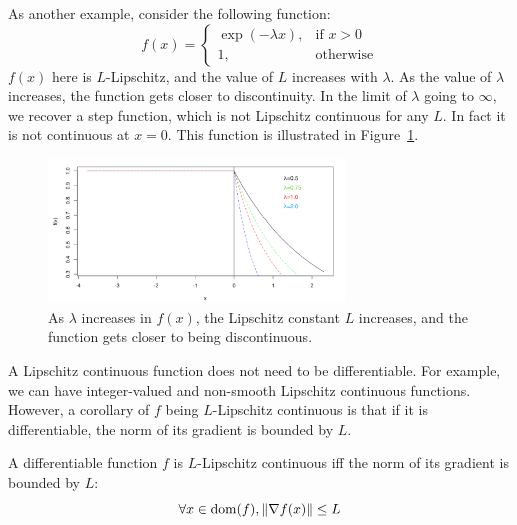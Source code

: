 \documentclass{article}
\DeclareMathOperator*{\dom}{dom}
\DeclarePairedDelimiter{\norm}{\lVert}{\rVert}
\begin{document}

As another example, consider the following function:
\[
    f(x)= 
\begin{cases}
    \exp(-\lambda x),& \text{if } x > 0\\
    1,              & \text{otherwise}
\end{cases}
\]
$f(x)$ here is $L$-Lipschitz, and the value of $L$ increases with $\lambda$.
As the value of $\lambda$ increases, the function gets closer to discontinuity.
In the limit of $\lambda$ going to $\infty$, we recover a step function, which is not Lipschitz continuous for any $L$.
In fact it is not continuous at $x=0$.
This function is illustrated in Figure~\ref{fig:lambda}.

\begin{figure}[ht]
\centering
    \includegraphics[width=0.7\textwidth]{lambda.png}
    \vspace{-10px}
    \caption{As $\lambda$ increases in $f(x)$, the Lipschitz constant $L$ increases, and the function gets closer to being discontinuous.}
    \label{fig:lambda}
\end{figure}

A Lipschitz continuous function does not need to be differentiable. For example, we can have integer-valued and non-smooth Lipschitz continuous functions. However, a corollary of $f$ being $L$-Lipschitz continuous is that if it is differentiable, the norm of its gradient is bounded by $L$.

\begin{lemma}\label{lemma:lip}
    A differentiable function $f$ is $L$-Lipschitz continuous iff the norm of its gradient is bounded by $L$:
    \[
    \forall x \in \dom(f), \norm{\nabla f(x)} \leq L
    \]
\end{lemma}{}
\end{document}
